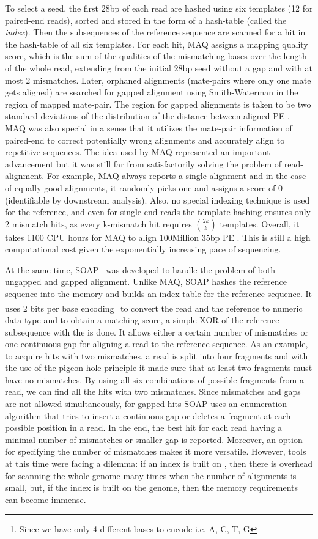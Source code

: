 To select a seed, the first 28bp of each read are hashed using six templates (12 for paired-end reads), sorted and stored in the form of a hash-table (called the \textit{index}). Then the subsequences of the reference sequence are scanned for a hit in the hash-table of all six templates. For each hit, MAQ assigns a mapping quality score, which is the sum of the qualities of the mismatching bases over the length of the whole read, extending from the initial 28bp seed without a gap and with at most 2 mismatches. Later, orphaned alignments (mate-pairs where only one mate gets aligned) are searched for gapped alignment using Smith-Waterman in the region of mapped mate-pair. The region for gapped alignments is taken to be two standard deviations of the distribution of the distance between aligned PE \reads. MAQ was also special in a sense that it utilizes the mate-pair information of paired-end \reads to correct potentially wrong alignments and accurately align \reads to repetitive sequences. The idea used by MAQ represented an important advancement but it was still far from satisfactorily solving the problem of read-alignment. For example, MAQ always reports a single alignment and in the case of equally good alignments, it randomly picks one and assigns a score of 0 (identifiable by downstream analysis). Also, no special indexing technique is used for the reference, and even for single-end reads the template hashing ensures only 2 mismatch hits, as every k-mismatch hit requires $\binom{2k}{k}$ templates. Overall, it takes 1100 CPU hours for MAQ to align 100Million 35bp PE \reads . This is still a high computational cost given the exponentially increasing pace of sequencing.

At the same time, SOAP~\citep{li2008soap} was developed to handle the problem of both ungapped and gapped alignment. Unlike MAQ, SOAP hashes the reference sequence into the memory and builds an index table for the reference sequence. It uses 2 bits per base encoding\footnote{Since we have only 4 different bases to encode i.e. A, C, T, G} to convert the read and the reference to numeric data-type and to obtain a matching score, a simple XOR of the reference subsequence with the \reads is done. It allows either a certain number of mismatches or one continuous gap for aligning a read to the reference sequence. As an example, to acquire hits with two mismatches, a read is split into four fragments and with the use of the pigeon-hole principle it made sure that at least two fragments must have no mismatches. By using all six combinations of possible fragments from a read, we can find all the hits with two mismatches. Since mismatches and gaps are not allowed simultaneously, for gapped hits SOAP uses an enumeration algorithm that tries to insert a continuous gap or deletes a fragment at each possible position in a read. In the end, the best hit for each read having a minimal number of mismatches or smaller gap is reported.  Moreover, an option for specifying the number of mismatches makes it more versatile. However, tools at this time were facing a dilemma: if an index is built on \reads, then there is overhead for scanning the whole genome many times when the number of alignments is small, but, if the index is built on the genome, then the memory requirements can become immense.

